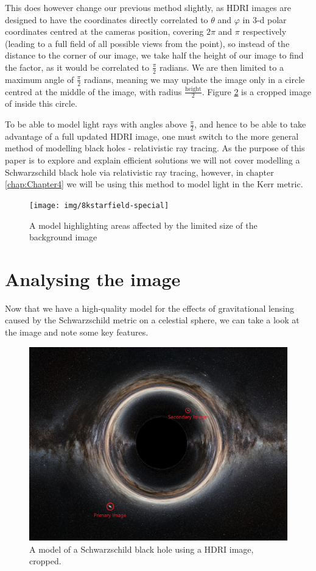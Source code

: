 \documentclass[oneside,openright,frontopenright, singlespacing]{dmathesis}
\begin{document}
\vspace{1em}
	This does however change our previous method slightly, as HDRI images are designed to have the coordinates directly correlated to $\theta$ and $\varphi$ in 3-d polar coordinates centred at the cameras position, covering $2\pi$ and $\pi$ respectively (leading to a full field of all possible views from the point), so instead of the distance to the corner of our image, we take half the height of our image to find the factor, as it would be correlated to $\frac{\pi}{2}$ radians. We are then limited to a maximum angle of $\frac{\pi}{2}$ radians, meaning we may update the image only in a circle centred at the middle of the image, with radius $\frac{\mbox{height}}{2}$. Figure \ref{fig:Figure3.5} is a cropped image of inside this circle.

\vspace{1em}
	To be able to model light rays with angles above $\frac{\pi}{2}$, and hence to be able to take advantage of a full updated HDRI image, one must switch to the more general method of modelling black holes - relativistic ray tracing. As the purpose of this paper is to explore and explain efficient solutions we will not cover modelling a Schwarzschild black hole via relativistic ray tracing, however, in chapter \ref{chap:Chapter4} we will be using this method to model light in the Kerr metric.

\begin{figure}[!ht]
	\centering
	\texttt{[image: img/8kstarfield-special]}
	\caption{A model highlighting areas affected by the limited size of the background image}
	\label{fig:Figure3.4}
\end{figure}

\section{Analysing the image}\label{sec:Section3.6}

	Now that we have a high-quality model for the effects of gravitational lensing caused by the Schwarzschild metric on a celestial sphere, we can take a look at the image and note some key features.

\begin{figure}[!ht]
	\centering
	\includegraphics[width=0.8\linewidth]{img/milkyway-SC}
	\caption{A model of a Schwarzschild black hole using a HDRI image, cropped.}
	\label{fig:Figure3.5}
\end{figure}
\end{document}
